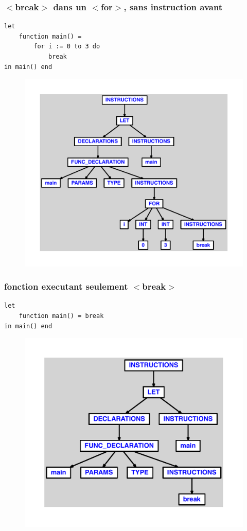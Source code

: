 \documentclass{article}
\begin{document}
\subsubsection{$ < $break$ > $ dans un $ < $for$ > $, sans instruction avant}
\begin{lstlisting}
let
	function main() =
		for i := 0 to 3 do
			break
in main() end
\end{lstlisting}
\newpage
\begin{figure}[H]
\centering
\includegraphics[max width=\textwidth]{ast/ast_11.pdf}
\end{figure}
\newpage
\subsubsection{fonction executant seulement $ < $break$ > $}
\begin{lstlisting}
let
	function main() = break
in main() end
\end{lstlisting}
\newpage
\begin{figure}[H]
\centering
\includegraphics[max width=\textwidth]{ast/ast_12.pdf}
\end{figure}
\newpage
\end{document}
